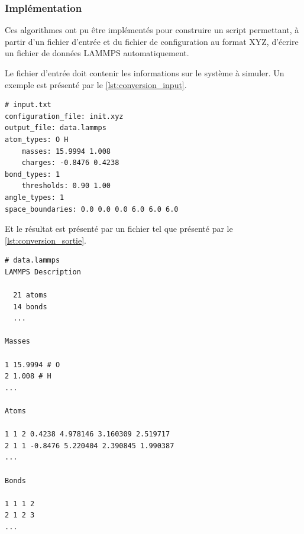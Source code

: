 \documentclass[11pt, a4paper]{article}
\begin{document}
		\subsubsection{Implémentation}

Ces algorithmes ont pu être implémentés pour construire un script permettant, à partir d'un fichier d'entrée et du fichier de configuration au format XYZ, d'écrire un fichier de données LAMMPS automatiquement.

Le fichier d'entrée doit contenir les informations sur le système à simuler. Un exemple est présenté par le \autoref{lst:conversion_input}.

\begin{lstlisting}[caption={Fichier d'entrée pour la conversion}, label={lst:conversion_input}]
# input.txt
configuration_file: init.xyz
output_file: data.lammps
atom_types: O H
	masses: 15.9994 1.008
	charges: -0.8476 0.4238
bond_types: 1
	thresholds: 0.90 1.00
angle_types: 1
space_boundaries: 0.0 0.0 0.0 6.0 6.0 6.0
\end{lstlisting}

Et le résultat est présenté par un fichier tel que présenté par le \autoref{lst:conversion_sortie}.

\begin{lstlisting}[caption={Fichier de sortie de la conversion}, label={lst:conversion_sortie}]
# data.lammps
LAMMPS Description

  21 atoms
  14 bonds
  ...

Masses

1 15.9994 # O
2 1.008 # H
...

Atoms

1 1 2 0.4238 4.978146 3.160309 2.519717
2 1 1 -0.8476 5.220404 2.390845 1.990387
...

Bonds

1 1 1 2 
2 1 2 3 
...
\end{lstlisting}
\end{document}
